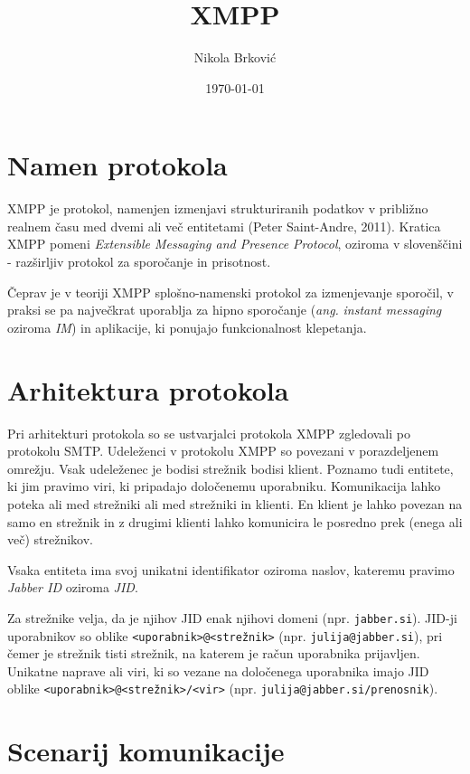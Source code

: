 \documentclass[11pt]{article}
\author{Nikola Brković}
\date{\today}
\title{XMPP}
\begin{document}
\maketitle

\section{Namen protokola}
\label{sec:orgfcb6b18}

XMPP je protokol, namenjen izmenjavi strukturiranih podatkov v
približno realnem času med dvemi ali več entitetami
(Peter Saint-Andre, 2011). Kratica XMPP pomeni \emph{Extensible Messaging and
Presence Protocol}, oziroma v slovenščini - razširljiv protokol za
sporočanje in prisotnost.

Čeprav je v teoriji XMPP splošno-namenski protokol za izmenjevanje
sporočil, v praksi se pa največkrat uporablja za hipno sporočanje
(\emph{ang.} \emph{instant messaging} oziroma \emph{IM}) in aplikacije, ki ponujajo
funkcionalnost klepetanja.

\section{Arhitektura protokola}
\label{sec:orge4c8fb1}

Pri arhitekturi protokola so se ustvarjalci protokola XMPP zgledovali
po protokolu SMTP. Udeleženci v protokolu XMPP so povezani v
porazdeljenem omrežju. Vsak udeleženec je bodisi strežnik bodisi
klient. Poznamo tudi entitete, ki jim pravimo viri, ki pripadajo
določenemu uporabniku. Komunikacija lahko poteka ali med strežniki ali
med strežniki in klienti. En klient je lahko povezan na samo en
strežnik in z drugimi klienti lahko komunicira le posredno prek (enega
ali več) strežnikov.

Vsaka entiteta ima svoj unikatni identifikator oziroma naslov,
kateremu pravimo \emph{Jabber ID} oziroma \emph{JID}.

Za strežnike velja, da je njihov JID enak njihovi domeni
(npr. \texttt{jabber.si}).  JID-ji uporabnikov so oblike
\texttt{<uporabnik>@<strežnik>} (npr. \texttt{julija@jabber.si}), pri čemer je
strežnik tisti strežnik, na katerem je račun uporabnika
prijavljen. Unikatne naprave ali viri, ki so vezane na določenega
uporabnika imajo JID oblike \texttt{<uporabnik>@<strežnik>/<vir>}
(npr. \texttt{julija@jabber.si/prenosnik}).

\section{Scenarij komunikacije}
\label{sec:orgb609060}
\end{document}
